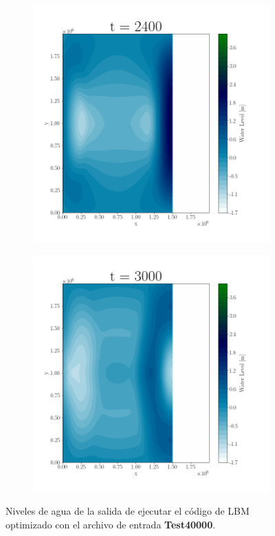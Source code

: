 \begin{figure}[H]
\begin{subfigure}[b]{.4\linewidth}
\includegraphics[width=\linewidth]{Figures/5-5.png}
\caption{}
\end{subfigure}
\begin{subfigure}[b]{.4\linewidth}
\includegraphics[width=\linewidth]{Figures/5-6.png}
\caption{}
\end{subfigure}
\caption{Niveles de agua de la salida de ejecutar el código de LBM optimizado con el archivo de entrada \textbf{Test40000}.}
\label{fig:24}
\end{figure}


